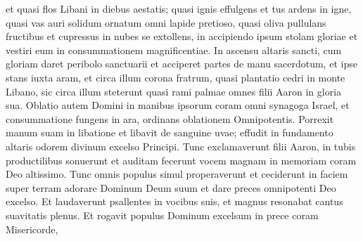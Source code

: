 \begin{biblechapter}
\begin{biblechapter}
\begin{biblechapter}
\begin{biblechapter}
\begin{biblechapter}
\begin{biblechapter}
\begin{biblechapter}
\begin{biblechapter}
\begin{biblechapter}
\begin{biblechapter}
\begin{biblechapter}
\begin{biblechapter}
\begin{biblechapter}
\begin{biblechapter}
\begin{biblechapter}
\begin{biblechapter}
\begin{biblechapter}
\begin{biblechapter}
\begin{biblechapter}
\begin{biblechapter}
\begin{biblechapter}
\begin{biblechapter}
\begin{biblechapter}
\begin{biblechapter}
\begin{biblechapter}
\begin{biblechapter}
\begin{biblechapter}
\begin{biblechapter}
\begin{biblechapter}
\begin{biblechapter}
\begin{biblechapter}
\begin{biblechapter}
\begin{biblechapter}
\begin{biblechapter}
\begin{biblechapter}
\begin{biblechapter}
\begin{biblechapter}
\begin{biblechapter}
\begin{biblechapter}
\begin{biblechapter}
\begin{biblechapter}
\begin{biblechapter}
\begin{biblechapter}
\begin{biblechapter}
\begin{biblechapter}
\begin{biblechapter}
\begin{biblechapter}
\begin{biblechapter}
\begin{biblechapter}
\begin{biblechapter}
 et quasi flos Libani in diebus aestatis;
 \verse quasi ignis effulgens et tus ardens in igne,
 \verse quasi vas auri solidum
 ornatum omni lapide pretioso,
 \verse quasi oliva pullulans fructibus
 et cupressus in nubes se extollens,
 in accipiendo ipsum stolam gloriae et vestiri eum in consummationem magnificentiae.
 \verse In ascensu altaris sancti,
 cum gloriam daret peribolo sanctuarii
 \verse et acciperet partes de manu sacerdotum,
 et ipse stans iuxta aram,
 et circa illum corona fratrum,
 quasi plantatio cedri in monte Libano,
 \verse sic circa illum steterunt quasi rami palmae
 omnes filii Aaron in gloria sua.
 \verse Oblatio autem Domini in manibus ipsorum
 coram omni synagoga Israel,
 et consummatione fungens in ara,
 ordinans oblationem Omnipotentis.
 \verse Porrexit manum suam in libatione
 et libavit de sanguine uvae;
 \verse effudit in fundamento altaris
 odorem divinum excelso Principi.
 \verse Tunc exclamaverunt filii Aaron,
 in tubis productilibus sonuerunt
 et auditam fecerunt vocem magnam
 in memoriam coram Deo altissimo.
 \verse Tunc omnis populus simul properaverunt
 et ceciderunt in faciem super terram
 adorare Dominum Deum suum
 et dare preces omnipotenti Deo excelso.
 \verse Et laudaverunt psallentes in vocibus suis,
 et magnus resonabat cantus suavitatis plenus.
 \verse Et rogavit populus Dominum excelsum in prece coram Misericorde,

\end{biblechapter}
\end{biblechapter}
\end{biblechapter}
\end{biblechapter}
\end{biblechapter}
\end{biblechapter}
\end{biblechapter}
\end{biblechapter}
\end{biblechapter}
\end{biblechapter}
\end{biblechapter}
\end{biblechapter}
\end{biblechapter}
\end{biblechapter}
\end{biblechapter}
\end{biblechapter}
\end{biblechapter}
\end{biblechapter}
\end{biblechapter}
\end{biblechapter}
\end{biblechapter}
\end{biblechapter}
\end{biblechapter}
\end{biblechapter}
\end{biblechapter}
\end{biblechapter}
\end{biblechapter}
\end{biblechapter}
\end{biblechapter}
\end{biblechapter}
\end{biblechapter}
\end{biblechapter}
\end{biblechapter}
\end{biblechapter}
\end{biblechapter}
\end{biblechapter}
\end{biblechapter}
\end{biblechapter}
\end{biblechapter}
\end{biblechapter}
\end{biblechapter}
\end{biblechapter}
\end{biblechapter}
\end{biblechapter}
\end{biblechapter}
\end{biblechapter}
\end{biblechapter}
\end{biblechapter}
\end{biblechapter}
\end{biblechapter}
